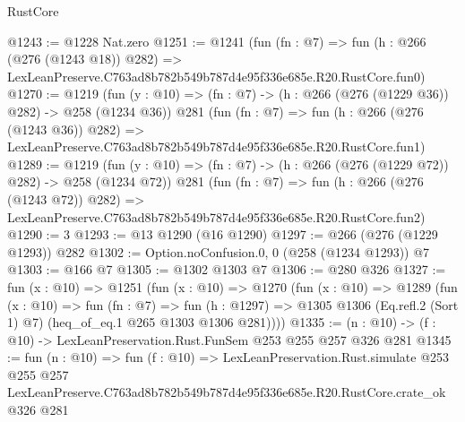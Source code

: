 \begin{lexlean}{RustCore}
\begin{coremodule}
@1243 := @1228 Nat.zero
@1251 := @1241
    (fun (fn : @7) =>
    fun (h : @266 (@276 (@1243 @18)) @282) =>
    LexLeanPreserve.C763ad8b782b549b787d4e95f336e685e.R20.RustCore.fun0)
@1270 := @1219
    (fun (y : @10) => (fn : @7) -> (h : @266 (@276 (@1229 @36)) @282) -> @258 (@1234 @36))
    @281
    (fun (fn : @7) =>
    fun (h : @266 (@276 (@1243 @36)) @282) =>
    LexLeanPreserve.C763ad8b782b549b787d4e95f336e685e.R20.RustCore.fun1)
@1289 := @1219
    (fun (y : @10) => (fn : @7) -> (h : @266 (@276 (@1229 @72)) @282) -> @258 (@1234 @72))
    @281
    (fun (fn : @7) =>
    fun (h : @266 (@276 (@1243 @72)) @282) =>
    LexLeanPreserve.C763ad8b782b549b787d4e95f336e685e.R20.RustCore.fun2)
@1290 := 3
@1293 := @13 @1290 (@16 @1290)
@1297 := @266 (@276 (@1229 @1293)) @282
@1302 := Option.noConfusion.{0, 0} (@258 (@1234 @1293)) @7
@1303 := @166 @7
@1305 := @1302 @1303 @7
@1306 := @280 @326
@1327 := fun (x : @10) =>
  @1251
    (fun (x : @10) =>
    @1270
      (fun (x : @10) =>
      @1289
        (fun (x : @10) =>
        fun (fn : @7) =>
        fun (h : @1297) =>
        @1305 @1306 (Eq.refl.{2} (Sort 1) @7) (heq_of_eq.{1} @265 @1303 @1306 @281))))
@1335 := (n : @10) -> (f : @10) -> LexLeanPreservation.Rust.FunSem @253 @255 @257 @326 @281
@1345 := fun (n : @10) =>
  fun (f : @10) =>
  LexLeanPreservation.Rust.simulate
    @253
    @255
    @257
    LexLeanPreserve.C763ad8b782b549b787d4e95f336e685e.R20.RustCore.crate_ok
    @326
    @281
\end{coremodule}
\end{lexlean}
